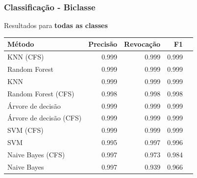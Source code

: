 \documentclass[t]{beamer}
\begin{document}
\begin{frame}[c]
	\frametitle{Classificação - Biclasse}

	\centering
	Resultados para \textbf{todas as classes}

	\small{
		\begin{table}[h]
		\centering
		\begin{tabulary}{\linewidth}{|L|R|R|R|R|}
			\hline
			\textbf{Método} & \textbf{Precisão} & \textbf{Revocação} & \textbf{F1} \\ \hline
			KNN (CFS)               & 0.999 & 0.999 & 0.999 \\ \hline
			Random Forest           & 0.999 & 0.999 & 0.999 \\ \hline
			KNN                     & 0.999 & 0.999 & 0.999 \\ \hline
			Random Forest (CFS)     & 0.998 & 0.998 & 0.998 \\ \hline
			Árvore de decisão       & 0.999 & 0.999 & 0.999 \\ \hline
			Árvore de decisão (CFS) & 0.999 & 0.999 & 0.999 \\ \hline
			SVM (CFS)               & 0.999 & 0.999 & 0.999 \\ \hline
			SVM                     & 0.995 & 0.997 & 0.996 \\ \hline
			Naive Bayes (CFS)       & 0.997 & 0.973 & 0.984 \\ \hline
			Naive Bayes             & 0.997 & 0.939 & 0.966 \\ \hline
		\end{tabulary}
	\end{table}
	}
\end{frame}
\end{document}
